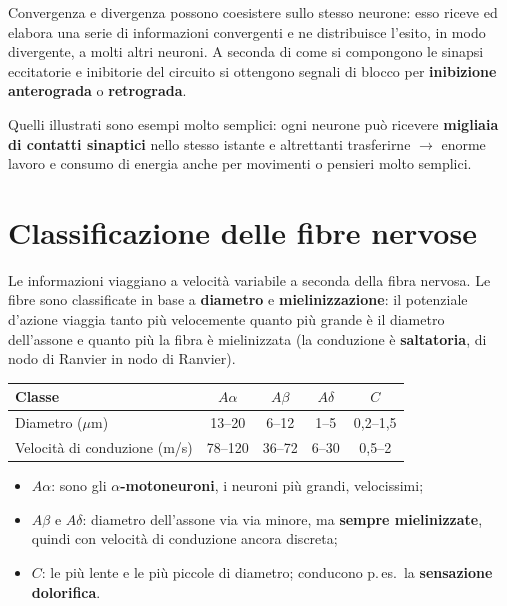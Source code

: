 Convergenza e divergenza possono coesistere sullo stesso neurone: esso riceve ed elabora una serie
di informazioni convergenti e ne distribuisce l'esito, in modo divergente, a molti altri neuroni.
A seconda di come si compongono le sinapsi eccitatorie e inibitorie del circuito si ottengono
segnali di blocco per \textbf{inibizione anterograda} o \textbf{retrograda}.

Quelli illustrati sono esempi molto semplici: ogni neurone può ricevere \textbf{migliaia di
contatti sinaptici} nello stesso istante e altrettanti trasferirne $\rightarrow$ enorme lavoro e
consumo di energia anche per movimenti o pensieri molto semplici.

\section{Classificazione delle fibre nervose}

Le informazioni viaggiano a velocità variabile a seconda della fibra nervosa. Le fibre sono
classificate in base a \textbf{diametro} e \textbf{mielinizzazione}: il potenziale d'azione viaggia
tanto più velocemente quanto più grande è il diametro dell'assone e quanto più la fibra è
mielinizzata (la conduzione è \textbf{saltatoria}, di nodo di Ranvier in nodo di Ranvier).

\begin{table}[htbp]
  \centering
  \small
  \renewcommand{\arraystretch}{1.3}
  \begin{tabularx}{\textwidth}{|X|c|c|c|c|}
    \hline
    \textbf{Classe} & $A\alpha$ & $A\beta$ & $A\delta$ & $C$ \\
    \hline
    Diametro ($\mu$m) & 13--20 & 6--12 & 1--5 & 0,2--1,5 \\
    \hline
    Velocità di conduzione (m/s) & 78--120 & 36--72 & 6--30 & 0,5--2 \\
    \hline
  \end{tabularx}
\end{table}

\begin{itemize}
  \item $A\alpha$: sono gli \textbf{$\alpha$-motoneuroni}, i neuroni più grandi, velocissimi;
  \item $A\beta$ e $A\delta$: diametro dell'assone via via minore, ma \textbf{sempre mielinizzate},
    quindi con velocità di conduzione ancora discreta;
  \item $C$: le più lente e le più piccole di diametro; conducono p.\,es.\ la \textbf{sensazione
    dolorifica}.
\end{itemize}

